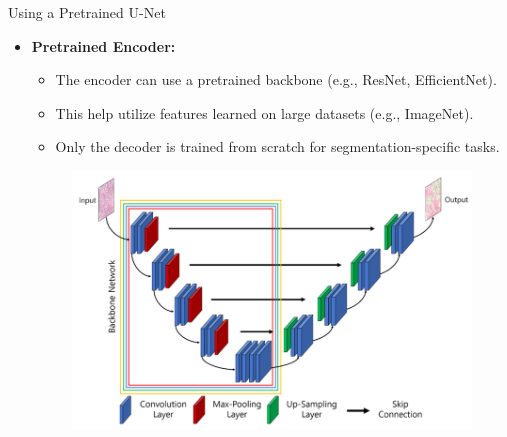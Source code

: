 \documentclass[10pt]{beamer}
\theoremstyle{remark}
\theoremstyle{definition}
\begin{document}
\begin{frame}{Using a Pretrained U-Net}
\begin{itemize}
    \item \textbf{Pretrained Encoder:}
    \begin{itemize}
        \item The encoder can use a pretrained backbone (e.g., ResNet, EfficientNet).
        \item This help utilize features learned on large datasets (e.g., ImageNet).
        \item Only the decoder is trained from scratch for segmentation-specific tasks.
    \end{itemize}
    \begin{figure}
    \centering
    \includegraphics[width=0.75\linewidth]{images/pretrained_unet.png} 
\end{figure}
        
\end{itemize}
\end{frame}
\end{document}
